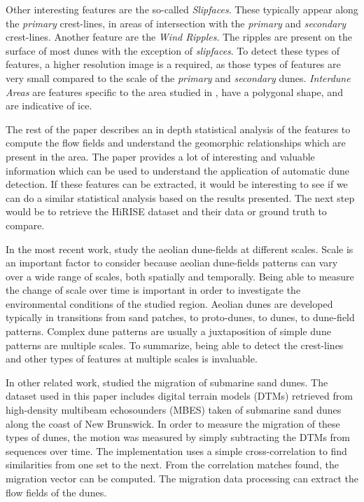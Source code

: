 Other interesting features are the so-called \emph{Slipfaces}. These typically appear along the \emph{primary} crest-lines, in areas of intersection with the \emph{primary} and \emph{secondary} crest-lines. Another feature are the \emph{Wind Ripples}. The ripples are present on the surface of most dunes with the exception	of \emph{slipfaces}. To detect	these types of features, a higher resolution image is a required, as those types of features are very small compared to the scale of the \emph{primary} and \emph{secondary}	dunes. \emph{Interdune Areas} are features specific to the area studied in \cite{Ewing_Peyret_Kocurek_Bourke},	have a polygonal shape, and are indicative of ice.

The rest of the paper describes an in depth statistical analysis of the features to compute the flow fields and understand the geomorphic relationships which are present in the area. The paper \cite{Ewing_Peyret_Kocurek_Bourke} provides a lot of interesting and valuable information which can be used to understand the application of automatic dune detection. If these features can be extracted, it would be interesting to see if we can do a similar statistical analysis based on the results presented. The next step would be to retrieve the HiRISE dataset and their data or ground truth to compare.

In the most recent work, \cite{Multi_spatial_analysis_aeolian_dune_field_patterns} study the aeolian dune-fields at different scales. Scale is an important factor to consider because aeolian dune-fields patterns can vary over	a wide range of scales, both spatially and temporally. Being able to measure the change of scale over time is important in order to investigate the environmental conditions of the studied region. Aeolian	dunes are developed typically in transitions from sand patches, to proto-dunes, to dunes, to dune-field patterns. Complex dune patterns are usually a juxtaposition of simple dune patterns are multiple scales. To summarize, being able to detect the crest-lines and other types of features at multiple scales is invaluable.

In other related work, \cite{Application_spatial_cross_correlation_detection_submarine_dunes} studied the migration of submarine sand dunes. The dataset used in this paper includes digital terrain models (DTMs) retrieved from high-density multibeam echosounders (MBES) taken of submarine sand dunes along the coast of New Brunswick. In order to measure the migration of these types of dunes, the motion was measured by simply subtracting the DTMs from sequences over time. The implementation uses a simple cross-correlation to find similarities from one set to the next. From the correlation matches found, the migration vector can be computed. The migration data processing can extract the flow fields of the dunes.

